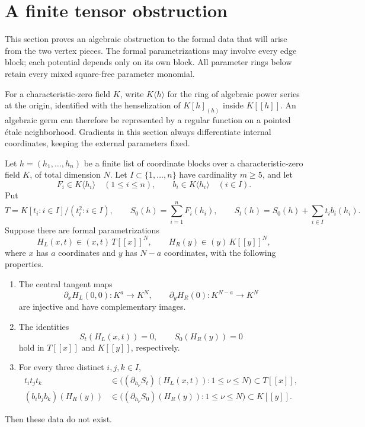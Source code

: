 \section{A finite tensor obstruction}\label{sec:tensor}

This section proves an algebraic obstruction to the formal data that will
arise from the two vertex pieces.  The formal parametrizations may involve
every edge block; each potential depends only on its own block.
All parameter rings below retain every mixed square-free parameter monomial.

For a characteristic-zero field \(K\), write \(K\langle h\rangle\) for the
ring of algebraic power series at the origin, identified with the
henselization of \(K[h]_{(h)}\) inside \(K[[h]]\).  An algebraic germ can
therefore be represented by a regular function on a pointed étale
neighborhood.  Gradients in this section always differentiate internal
coordinates, keeping the external parameters fixed.

\begin{theorem}\label{thm:tensor-obstruction}
Let \(h=(h_1,\ldots,h_n)\) be a finite list of coordinate blocks over a
characteristic-zero field \(K\), of total dimension \(N\).  Let
\(I\subset\{1,\ldots,n\}\) have cardinality \(m\geq5\), and let
\[
 F_i\in K\langle h_i\rangle\quad(1\leq i\leq n),
 \qquad b_i\in K\langle h_i\rangle\quad(i\in I).
\]
Put
\[
 T=K[t_i:i\in I]/(t_i^2:i\in I),\qquad
 S_0(h)=\sum_{i=1}^nF_i(h_i),\qquad
 S_t(h)=S_0(h)+\sum_{i\in I}t_i b_i(h_i).
\]
Suppose there are formal parametrizations
\[
 H_L(x,t)\in (x,t)\,T[[x]]^N,\qquad
 H_R(y)\in (y)\,K[[y]]^N,
\]
where \(x\) has \(a\) coordinates and \(y\) has \(N-a\) coordinates, with
the following properties.
\begin{enumerate}[label=\textup{(\roman*)}]
 \item The central tangent maps
 \[
  \partial_xH_L(0,0):K^a\longrightarrow K^N,\qquad
  \partial_yH_R(0):K^{N-a}\longrightarrow K^N
 \]
 are injective and have complementary images.
 \item The identities
 \[
     S_t(H_L(x,t))=0,\qquad S_0(H_R(y))=0
 \]
 hold in \(T[[x]]\) and \(K[[y]]\), respectively.
 \item For every three distinct \(i,j,k\in I\),
 \begin{align}
 t_i t_j t_k
 &\in\bigl((\partial_{h_\nu}S_t)(H_L(x,t)):
                    1\leq\nu\leq N\bigr)\subset T[[x]],
       \label{eq:tensor-source-membership}\\
 (b_i b_j b_k)(H_R(y))
 &\in\bigl((\partial_{h_\nu}S_0)(H_R(y)):
                    1\leq\nu\leq N\bigr)\subset K[[y]].
       \label{eq:tensor-target-membership}
 \end{align}
\end{enumerate}
Then these data do not exist.
\end{theorem}

